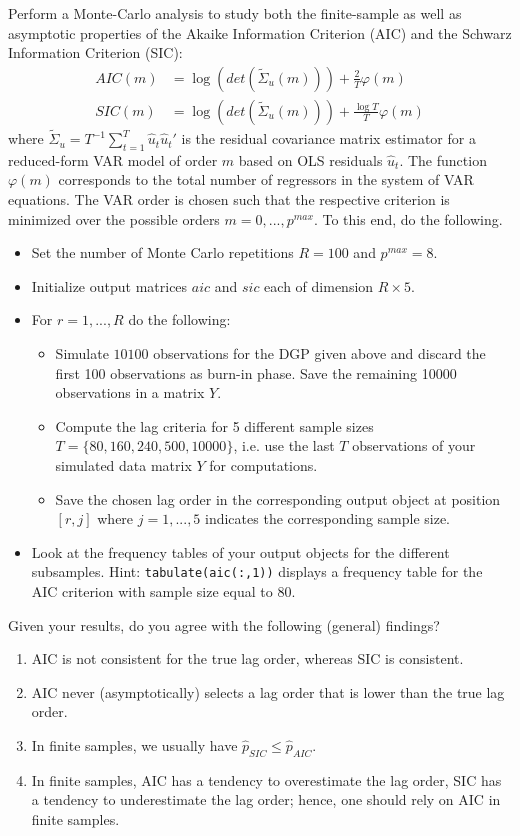 \documentclass{article}
\begin{document}
Perform a Monte-Carlo analysis to study both the finite-sample as well as asymptotic properties of the Akaike Information Criterion (AIC) and the Schwarz Information Criterion (SIC):
\begin{align*}
AIC(m)  &= \log(det(\tilde{\Sigma}_u(m))) + \frac{2}{T}\varphi(m)\\
SIC(m)  &= \log(det(\tilde{\Sigma}_u(m))) + \frac{\log T}{T}\varphi(m)
\end{align*}
where $\tilde{\Sigma}_u=T^{-1}\sum_{t=1}^T \hat{u}_t\hat{u}_t'$ is the residual covariance matrix estimator for a reduced-form VAR model of order $m$ based on OLS residuals $\hat{u}_t$. The function $\varphi(m)$ corresponds to the total number of regressors in the system of VAR equations. The VAR order is chosen such that the respective criterion is minimized over the possible orders $m = 0,...,p^{max}$. To this end, do the following.

\begin{itemize}
	\item Set the number of Monte Carlo repetitions $R=100$ and $p^{max}=8$.
	\item Initialize output matrices $aic$ and $sic$ each of dimension $R \times 5$. 
	\item For $r=1,...,R$ do the following:
	\begin{itemize}
		\item Simulate $10100$ observations for the DGP given above and discard the first 100 observations as burn-in phase. Save the remaining 10000 observations in a matrix $Y$.
		\item Compute the lag criteria for 5 different sample sizes $T=\{80, 160, 240, 500, 10000\}$, i.e. use the last $T$ observations of your simulated data matrix $Y$ for computations.
		\item Save the chosen lag order in the corresponding output object at position $[r,j]$ where $j=1,...,5$ indicates the corresponding sample size.
	\end{itemize}
	\item Look at the frequency tables of your output objects for the different subsamples. Hint: \texttt{tabulate(aic(:,1))} displays a frequency table for the AIC criterion with sample size equal to 80.
\end{itemize}
Given your results, do you agree with the following (general) findings?
\begin{enumerate}
	\item AIC is not consistent for the true lag order, whereas SIC is consistent.
	\item AIC never (asymptotically) selects a lag order that is lower than the true lag order.
	\item In finite samples, we usually have $\hat{p}_{SIC} \leq \hat{p}_{AIC}$.
	\item In finite samples, AIC has a tendency to overestimate the lag order, SIC has a tendency to underestimate the lag order; hence, one should rely on AIC in finite samples.
\end{enumerate}
\end{document}
